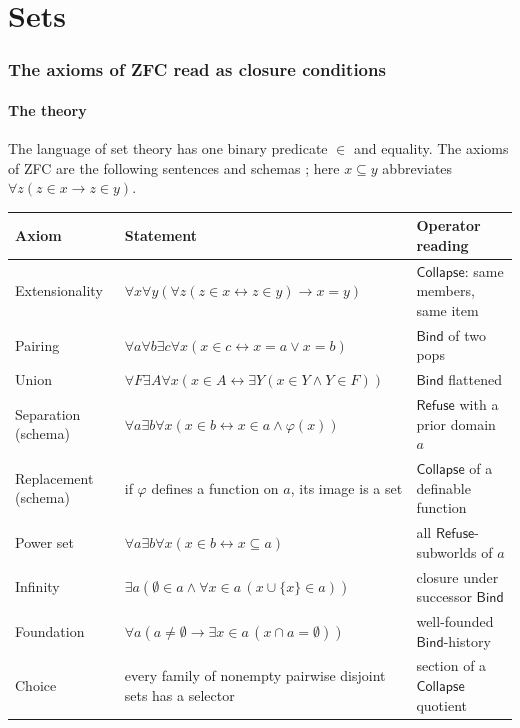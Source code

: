 \documentclass[11pt]{article}
\newcommand{\Refuse}{\mathsf{Refuse}}
\newcommand{\Bind}{\mathsf{Bind}}
\newcommand{\Coll}{\mathsf{Collapse}}
\theoremstyle{definition}
\theoremstyle{plain}
\theoremstyle{remark}
\begin{document}
\part{Sets}

\section{The axioms of ZFC read as closure conditions}\label{sec:zfc}

\subsection{The theory}

The language of set theory has one binary predicate $\in$ and equality. The axioms of ZFC are the following sentences and schemas \cite{Jech03,Kunen80}; here $x\subseteq y$ abbreviates $\forall z(z\in x\to z\in y)$.

\begin{center}
\footnotesize
\begin{tabular}{@{}p{}p{}p{}@{}}
\toprule
Axiom & Statement & Operator reading\\
\midrule
Extensionality & $\forall x\forall y(\forall z(z\in x\leftrightarrow z\in y)\to x=y)$ & $\Coll$: same members, same item\\
Pairing & $\forall a\forall b\exists c\forall x(x\in c\leftrightarrow x=a\vee x=b)$ & $\Bind$ of two pops\\
Union & $\forall F\exists A\forall x(x\in A\leftrightarrow\exists Y(x\in Y\wedge Y\in F))$ & $\Bind$ flattened\\
Separation (schema) & $\forall a\exists b\forall x(x\in b\leftrightarrow x\in a\wedge\varphi(x))$ & $\Refuse$ with a prior domain $a$\\
Replacement (schema) & if $\varphi$ defines a function on $a$, its image is a set & $\Coll$ of a definable function\\
Power set & $\forall a\exists b\forall x(x\in b\leftrightarrow x\subseteq a)$ & all $\Refuse$-subworlds of $a$\\
Infinity & $\exists a(\emptyset\in a\wedge\forall x\in a\,(x\cup\{x\}\in a))$ & closure under successor $\Bind$\\
Foundation & $\forall a(a\neq\emptyset\to\exists x\in a\,(x\cap a=\emptyset))$ & well-founded $\Bind$-history\\
Choice & every family of nonempty pairwise disjoint sets has a selector & section of a $\Coll$ quotient\\
\bottomrule
\end{tabular}
\end{center}
\end{document}
